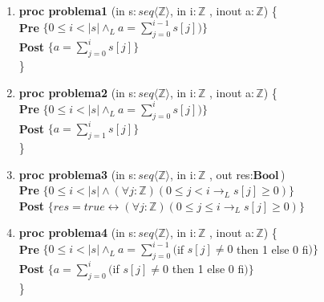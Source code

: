 \documentclass{article}
\begin{document}
\begin{enumerate}[label=\alph*)]
\item \textbf{proc problema1 }(in s$: seq\langle \mathbb{Z}\rangle$, in i$:\mathbb{Z}$
	, inout a$: \mathbb{Z}$) \{\smallskip \\                            
    \hspace*{6mm} \textbf{Pre }$\{0 \leq i < |s| \wedge_L a=\sum_{j=0}^{i-1} s[j])\}$\smallskip \\          
   \hspace*{6mm} \textbf{Post }$\{a=\sum_{j=0}^{i} s[j] \}$\\
   \}    

\item \textbf{proc problema2 }(in s$: seq\langle \mathbb{Z}\rangle$, in i$:\mathbb{Z}$
	, inout a$: \mathbb{Z}$) \{\smallskip \\                            
    \hspace*{6mm} \textbf{Pre }$\{0 \leq i < |s| \wedge_L a=\sum_{j=0}^{i} s[j])\}$\smallskip \\          
   \hspace*{6mm} \textbf{Post }$\{a=\sum_{j=1}^{i} s[j] \}$\\
   \}      

\item \textbf{proc problema3 }(in s$: seq\langle \mathbb{Z}\rangle$, in i$:\mathbb{Z}$
	, out res$:\textbf{Bool}$) {\\
   \hspace*{6mm} \textbf{Pre }$\{0 \leq i < |s| \wedge 
   		(\forall j :\mathbb{Z})(0 \leq j < i \rightarrow_L s[j] \geq 0)\}$\\
   \hspace*{6mm} \textbf{Post }$\{res = true \leftrightarrow (\forall j :\mathbb{Z})
          (0 \leq j \leq i \rightarrow_L s[j] \geq 0)\}$\\
   }

\item \textbf{proc problema4 }(in s$: seq\langle \mathbb{Z}\rangle$, in i$:\mathbb{Z}$
	, inout a$: \mathbb{Z}$) \{\smallskip \\                            
    \hspace*{6mm} \textbf{Pre }$\{0 \leq i < |s| \wedge_L a=\sum_{j=0}^{i-1}($if $s[j] \neq 0$ 
    then 1 else 0 fi$)\}$\smallskip \\          
   \hspace*{6mm} \textbf{Post }$\{a=\sum_{j=0}^{i}($if $s[j] \neq 0$ 
    then 1 else 0 fi$)\}$\\
   \}    


\end{enumerate}
\end{document}
